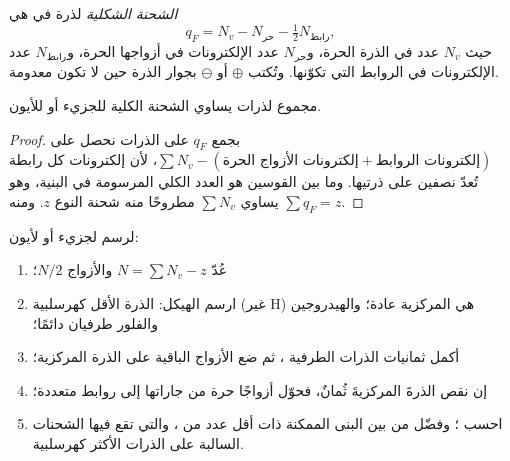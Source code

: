 \begin{definition}\label{def:b1:lewis-resonance-vsepr:formal-charge}
\emph{الشحنة الشكلية} لذرة في 
هي
\[
  q_F = N_v - N_{\text{حر}} - \tfrac12 N_{\text{رابط}},
\]
حيث $N_v$ عدد  في الذرة الحرة،
و$N_{\text{حر}}$ عدد الإلكترونات في أزواجها الحرة،
و$N_{\text{رابط}}$ عدد الإلكترونات في الروابط التي تكوّنها. وتُكتب
$\oplus$ أو $\ominus$ بجوار الذرة حين لا تكون معدومة.
\end{definition}

\begin{proposition}\label{prop:b1:lewis-resonance-vsepr:formal-sum}
مجموع  لذرات  يساوي
الشحنة الكلية للجزيء أو للأيون.
\end{proposition}

\begin{proof}
بجمع $q_F$ على الذرات نحصل على $\sum N_v - (\text{إلكترونات الأزواج
الحرة} + \text{إلكترونات الروابط})$، لأن إلكترونات كل رابطة
تُعدّ نصفين على ذرتيها. وما بين القوسين هو العدد الكلي
 المرسومة في البنية، وهو يساوي $\sum N_v$ مطروحًا منه
شحنة النوع $z$. ومنه $\sum q_F = z$.
\end{proof}

\begin{method}\label{met:b1:lewis-resonance-vsepr:lewis}
لرسم  لجزيء أو لأيون:
\begin{enumerate}
  \item عُدّ  $N = \sum N_v - z$ والأزواج $N/2$؛
  \item ارسم الهيكل: الذرة الأقل كهرسلبية (غير H) هي
        المركزية عادة؛ والهيدروجين والفلور طرفيان دائمًا؛
  \item أكمل ثمانيات الذرات الطرفية ، ثم
        ضع الأزواج الباقية على الذرة المركزية؛
  \item إن نقص الذرةَ المركزيةَ ثُمانٌ، فحوّل أزواجًا حرة من
        جاراتها إلى روابط متعددة؛
  \item احسب ؛ وفضّل من بين البنى الممكنة
        ذات أقل عدد من ، والتي تقع فيها الشحنات السالبة على
        الذرات الأكثر كهرسلبية.
\end{enumerate}
\end{method}

